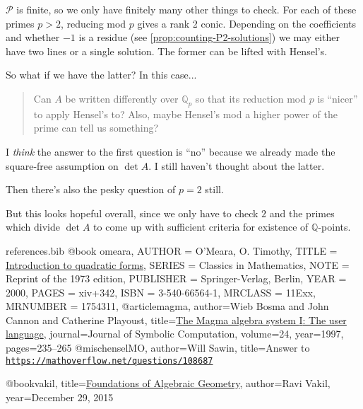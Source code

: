 \documentclass[10pt,a4paper]{amsart}
\numberwithin{equation}{section}
\numberwithin{figure}{section}
\theoremstyle{definition}
\theoremstyle{plain}
\theoremstyle{remark}
\theoremstyle{plain}
\theoremstyle{definition}
\theoremstyle{plain}
\theoremstyle{plain}
\newcommand{\Q}{\mathbb{Q}}
\begin{document}
    $\mathcal{P}$ is finite, so we only have finitely many other things to check. For each of these primes $p>2$, reducing mod $p$ gives a rank 2 conic. Depending on the coefficients and whether $-1$ is a residue (see \ref{prop:counting-P2-solutions}) we may either have two lines or a single solution. The former can be lifted with Hensel's.
    
    So what if we have the latter? In this case...
    \begin{quotation}
    	Can $A$ be written differently over $\Q_p$ so that its reduction mod $p$ is ``nicer'' to apply Hensel's to? Also, maybe Hensel's mod a higher power of the prime can tell us something?
    \end{quotation}
	I \emph{think} the answer to the first question is ``no'' because we already made the square-free assumption on $\det A$. I still haven't thought about the latter.
	
	Then there's also the pesky question of $p=2$ still.
	
	But this looks hopeful overall, since we only have to check $2$ and the primes which divide $\det A$ to come up with sufficient criteria for existence of $\Q$-points.

\begin{filecontents}{references.bib}
@book {omeara,
    AUTHOR = {O'Meara, O. Timothy},
     TITLE = {\href{https://link.springer.com/book/10.1007\%2F978-3-642-62031-7}{Introduction to quadratic forms}},
    SERIES = {Classics in Mathematics},
      NOTE = {Reprint of the 1973 edition},
 PUBLISHER = {Springer-Verlag, Berlin},
      YEAR = {2000},
     PAGES = {xiv+342},
      ISBN = {3-540-66564-1},
   MRCLASS = {11Exx},
  MRNUMBER = {1754311},
}
@article{magma,
author={Wieb Bosma and John Cannon and Catherine Playoust},
title={\href{http://www.sciencedirect.com/science/article/pii/S074771719690125X}{The Magma algebra system {I}: The user language}},
journal={Journal of Symbolic Computation},
volume={24},
year={1997},
pages={235--265}
}
@misc{henselMO,
	author={Will Sawin},
	title={Answer to \href{https://mathoverflow.net/questions/108687}{\texttt{https://mathoverflow.net/questions/108687}}}
}

@book{vakil,
title={\href{http://math.stanford.edu/~vakil/216blog/index.html}{Foundations of Algebraic Geometry}},
author={Ravi Vakil},
year={December 29, 2015}
}
\end{filecontents}



\end{document}
